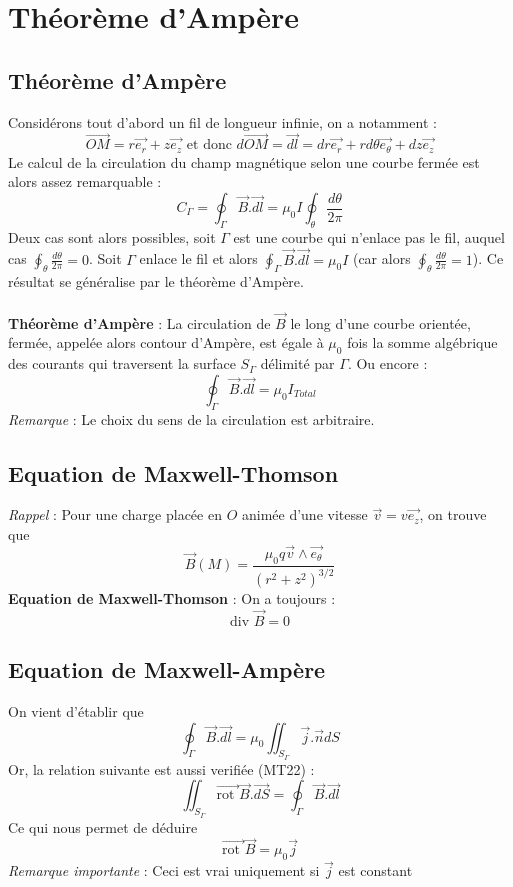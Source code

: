 \section{Théorème d'Ampère}
\subsection{Théorème d'Ampère}

Considérons tout d'abord un fil de longueur infinie, on a notamment :
\[ \vec{OM}=r\vec{e_r}+z\vec{e_z} \textrm{ et donc } d\vec{OM}=\vec{dl}=dr\vec{e_r}+rd\theta\vec{e_\theta}+dz\vec{e_z} \]
Le calcul de la circulation du champ magnétique selon une courbe fermée est alors assez remarquable :
\[ C_\Gamma=\oint_\Gamma\vec{B}.\vec{dl}=\mu_0I\oint_\theta\frac{d\theta}{2\pi} \]
Deux cas sont alors possibles, soit $\Gamma$ est une courbe qui n'enlace pas le fil, auquel cas $\oint_\theta\frac{d\theta}{2\pi}=0$. Soit $\Gamma$ enlace le fil et alors $\oint_\Gamma\vec{B}.\vec{dl}=\mu_0I$ (car alors $\oint_\theta\frac{d\theta}{2\pi}=1$). Ce résultat se généralise par le théorème d'Ampère.\\\\

\noindent\textbf{Théorème d'Ampère} : La circulation de $\vec B$ le long d'une courbe orientée, fermée, appelée alors contour d'Ampère, est égale à $\mu_0$ fois la somme algébrique des courants qui traversent la surface $S_\Gamma$ délimité par $\Gamma$. Ou encore :
\[ \oint_\Gamma\vec{B}.\vec{dl}=\mu_0I_{Total} \]
\emph{Remarque} : Le choix du sens de la circulation est arbitraire. 



\subsection{Equation de Maxwell-Thomson}

\noindent\emph{Rappel} : Pour une charge placée en $O$ animée d'une vitesse $\vec{v}=v\vec{e_z}$, on trouve que 
\[ \vec{B}(M)=\frac{\mu_0 q\vec{v}\land\vec{e_\theta}}{(r^2+z^2)^{3/2}} \]
\noindent\textbf{Equation de Maxwell-Thomson} : On a toujours : \[ \textrm{div }\vec{B}=0 \]

\subsection{Equation de Maxwell-Ampère}

On vient d'établir que \[ \oint_\Gamma\vec{B}.\vec{dl}=\mu_0\iint_{S_\Gamma}\vec{j}.\vec{n}dS \]
Or, la relation suivante est aussi verifiée (MT22) :
\[ \iint_{S_\Gamma}\vec{\textrm{rot }}\vec{B}.\vec{dS}=\oint_\Gamma \vec{B}.\vec{dl} \]
Ce qui nous permet de déduire
\[ \vec{\textrm{rot }}\vec{B}=\mu_0\vec{j} \]
\emph{Remarque importante} : Ceci est vrai uniquement si $\vec{j}$ est constant

